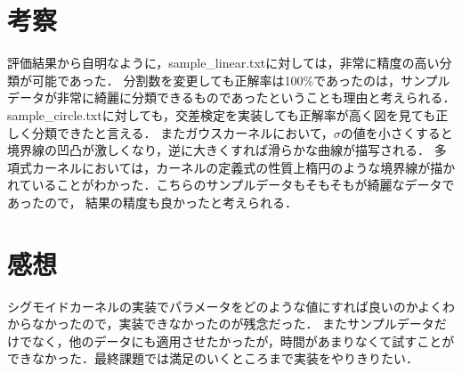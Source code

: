 \documentclass[11pt]{article}
\begin{document}
\section{考察}
評価結果から自明なように，sample\_linear.txtに対しては，非常に精度の高い分類が可能であった．
分割数を変更しても正解率は100\%であったのは，サンプルデータが非常に綺麗に分類できるものであったということも理由と考えられる．
sample\_circle.txtに対しても，交差検定を実装しても正解率が高く図を見ても正しく分類できたと言える．
またガウスカーネルにおいて，$\sigma$の値を小さくすると境界線の凹凸が激しくなり，逆に大きくすれば滑らかな曲線が描写される．
多項式カーネルにおいては，カーネルの定義式の性質上楕円のような境界線が描かれていることがわかった．こちらのサンプルデータもそもそもが綺麗なデータであったので，
結果の精度も良かったと考えられる．

\section{感想}
シグモイドカーネルの実装でパラメータをどのような値にすれば良いのかよくわからなかったので，実装できなかったのが残念だった．
またサンプルデータだけでなく，他のデータにも適用させたかったが，時間があまりなくて試すことができなかった．最終課題では満足のいくところまで実装をやりきりたい．
\end{document}
